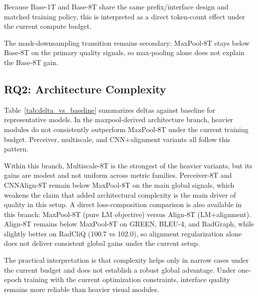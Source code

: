 Because Base-1T and Base-8T share the same prefix/interface design and matched training policy, this is interpreted as a direct token-count effect under the current compute budget.

The mask-downsampling transition remains secondary: MaxPool-8T stays below Base-8T on the primary quality signals, so max-pooling alone does not explain the Base-8T gain.

\subsection{RQ2: Architecture Complexity}
Table~\ref{tab:delta_vs_baseline} summarizes deltas against baseline for representative models. In the maxpool-derived architecture branch, heavier modules do not consistently outperform MaxPool-8T under the current training budget. Perceiver, multiscale, and CNN+alignment variants all follow this pattern.

Within this branch, Multiscale-8T is the strongest of the heavier variants, but its gains are modest and not uniform across metric families. Perceiver-8T and CNNAlign-8T remain below MaxPool-8T on the main global signals, which weakens the claim that added architectural complexity is the main driver of quality in this setup.
A direct loss-composition comparison is also available in this branch: MaxPool-8T (pure LM objective) versus Align-8T (LM+alignment). Align-8T remains below MaxPool-8T on \ac{GREEN}, BLEU-4, and \ac{RadGraph}, while slightly better on \ac{RadCliQ} (100.7 vs 102.0), so alignment regularization alone does not deliver consistent global gains under the current setup.

The practical interpretation is that complexity helps only in narrow cases under the current budget and does not establish a robust global advantage. Under one-epoch training with the current optimization constraints, interface quality remains more reliable than heavier visual modules.


